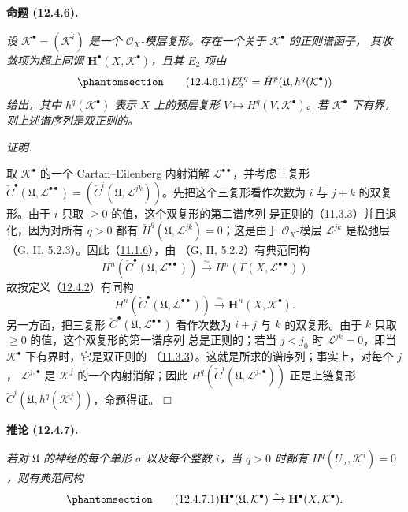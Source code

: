 \documentclass[UTF8,fontset=none,11pt,oneside,openany]{ctexbook}
\providecommand{\square}{\mdlgwhtsquare}
\newenvironment{proposition}[1][]{%
  \par\medskip\noindent\textbf{命题 (#1).}\ %
}{\par}
\newenvironment{corollary}[1][]{%
  \par\medskip\noindent\textbf{推论 (#1).}\ %
}{\par}
\newenvironment{proof}{%
  \par\smallskip\noindent\textit{证明.}\ %
}{\hfill$\square$\par}
\newcommand{\oldpage}[2][]{%
  \hypertarget{ega-source-page-#1-#2}{}%
  \marginnote{\scriptsize\textbf{#1}~|~#2}\ignorespaces}
\let\EGAOriginalLabel\label
\renewcommand{\label}[1]{\phantomsection\EGAOriginalLabel{#1}}
\begin{document}
\newpage
\begin{proposition}[12.4.6]
\label{0.12.4.6-fr}
\emph{设 $\mathcal K^\bullet=(\mathcal K^i)$ 是一个
$\mathcal O_X$-模层复形。存在一个关于 $\mathcal K^\bullet$ 的正则谱函子，
其收敛项为超上同调 $\mathbf H^\bullet(X,\mathcal K^\bullet)$，且其 $E_2$ 项由}
\begin{equation}
\label{0.12.4.6.1-fr}
\tag{12.4.6.1}
E_2^{pq}=\check H^p(\mathfrak U,h^q(\mathcal K^\bullet))
\end{equation}
\emph{给出，其中 $h^q(\mathcal K^\bullet)$ 表示 $X$ 上的预层复形
$V\mapsto H^q(V,\mathcal K^\bullet)$。若 $\mathcal K^\bullet$ 下有界，
则上述谱序列是双正则的。}
\end{proposition}

\begin{proof}
取 $\mathcal K^\bullet$ 的一个 Cartan--Eilenberg 内射消解
$\mathcal L^{\bullet\bullet}$，并考虑三复形
$\check C^\bullet(\mathfrak U,\mathcal L^{\bullet\bullet})
=(\check C^i(\mathfrak U,\mathcal L^{jk}))$。先把这个三复形看作次数为
$i$ 与 $j+k$ 的双复形。由于 $i$ 只取 $\geq0$ 的值，这个双复形的第二谱序列
是正则的（\hyperref[0.11.3.3-fr]{11.3.3}）并且退化，因为对所有 $q>0$ 都有
$\check H^q(\mathfrak U,\mathcal L^{jk})=0$；这是由于
$\mathcal O_X$-模层 $\mathcal L^{jk}$ 是松弛层
\oldpage[0\textsubscript{III}]{64}
（G, II, 5.2.3）。因此（\hyperref[0.11.1.6-fr]{11.1.6}），由
（G, II, 5.2.2）有典范同构
\[
H^n(\check C^\bullet(\mathfrak U,\mathcal L^{\bullet\bullet}))
\xrightarrow{\sim}
H^n(\Gamma(X,\mathcal L^{\bullet\bullet}))
\]
故按定义（\hyperref[0.12.4.2-fr]{12.4.2}）有同构
\[
H^n(\check C^\bullet(\mathfrak U,\mathcal L^{\bullet\bullet}))
\xrightarrow{\sim}\mathbf H^n(X,\mathcal K^\bullet).
\]
另一方面，把三复形
$\check C^\bullet(\mathfrak U,\mathcal L^{\bullet\bullet})$ 看作次数为
$i+j$ 与 $k$ 的双复形。由于 $k$ 只取 $\geq0$ 的值，这个双复形的第一谱序列
总是正则的；若当 $j<j_0$ 时 $\mathcal L^{jk}=0$，即当
$\mathcal K^\bullet$ 下有界时，它是双正则的
（\hyperref[0.11.3.3-fr]{11.3.3}）。这就是所求的谱序列；事实上，对每个 $j$，
$\mathcal L^{j,\bullet}$ 是 $\mathcal K^j$ 的一个内射消解；因此
$H^q(\check C^i(\mathfrak U,\mathcal L^{j,\bullet}))$ 正是上链复形
$\check C^i(\mathfrak U,h^q(\mathcal K^j))$，命题得证。
\end{proof}

\begin{corollary}[12.4.7]
\label{0.12.4.7-fr}
\emph{若对 $\mathfrak U$ 的神经的每个单形 $\sigma$ 以及每个整数 $i$，当
$q>0$ 时都有 $H^q(U_\sigma,\mathcal K^i)=0$，则有典范同构}
\begin{equation}
\label{0.12.4.7.1-fr}
\tag{12.4.7.1}
\mathbf H^\bullet(\mathfrak U,\mathcal K^\bullet)
\xrightarrow{\sim}\mathbf H^\bullet(X,\mathcal K^\bullet).
\end{equation}
\end{corollary}
\end{document}
